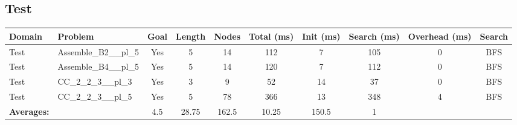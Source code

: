 \documentclass{article}
\begin{document}
\subsection*{Test}
\begin{landscape}
\begin{tabular}{llcccccccc}
\toprule
Domain & Problem & Goal & Length & Nodes & Total (ms) & Init (ms) & Search (ms) & Overhead (ms) & Search \\
\midrule
Test & Assemble\_B2\_\_pl\_5 & Yes & 5 & 14 & 112 & 7 & 105 & 0 & BFS \\
Test & Assemble\_B4\_\_pl\_5 & Yes & 5 & 14 & 120 & 7 & 112 & 0 & BFS \\
Test & CC\_2\_2\_3\_\_pl\_3 & Yes & 3 & 9 & 52 & 14 & 37 & 0 & BFS \\
Test & CC\_2\_2\_3\_\_pl\_5 & Yes & 5 & 78 & 366 & 13 & 348 & 4 & BFS \\
\textbf{Averages:} & & 4.5 & 28.75 & 162.5 & 10.25 & 150.5 & 1 & \\
\bottomrule
\end{tabular}
\end{landscape}
\newpage
\end{document}
